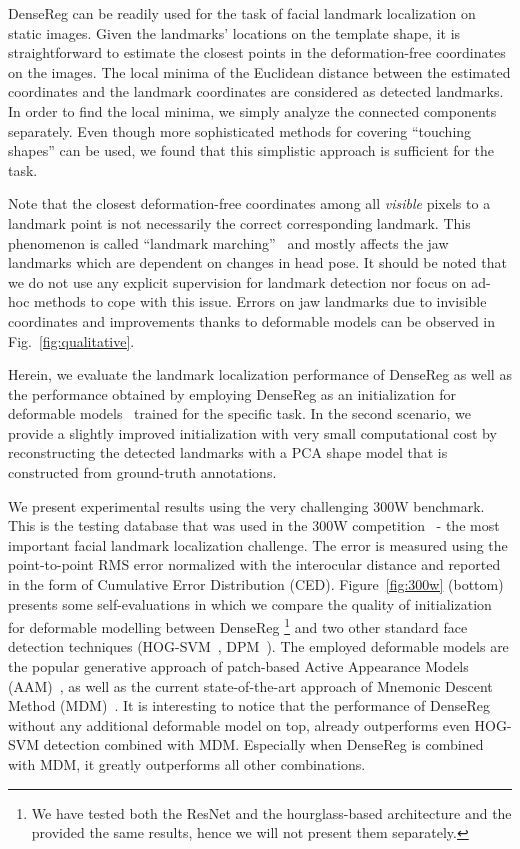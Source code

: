 DenseReg can be readily used for the task of facial landmark localization on static images. Given the landmarks' locations on the template shape, it is straightforward to estimate the closest points in the deformation-free coordinates on the images. The local minima of the Euclidean distance between the estimated coordinates and the landmark coordinates are considered as detected landmarks. In order to find the local minima, we simply analyze the connected components separately. Even though more sophisticated methods for covering ``touching shapes'' can be used, we found that this simplistic approach is sufficient for the task. 

Note that the closest deformation-free coordinates among all \emph{visible} pixels to a landmark point is not necessarily the correct corresponding landmark. This phenomenon is called ``landmark marching''~\cite{zhu2015high} and mostly affects the jaw landmarks which are dependent on changes in head pose. It should be noted that we do not use any explicit supervision for landmark detection nor focus on ad-hoc methods to cope with this issue. Errors on jaw landmarks due to invisible coordinates and improvements thanks to deformable models can be observed in Fig.~\ref{fig:qualitative}.

Herein, we evaluate the landmark localization performance of DenseReg as well as the performance obtained by employing DenseReg as an initialization for deformable models~\cite{papandreou2008adaptive,tzimiropoulos2014gauss,antonakos2015feature,trigeorgis2016mnemonic} trained for the specific task. In the second scenario, we provide a slightly improved initialization with very small computational cost by reconstructing the detected landmarks with a PCA shape model that is constructed from ground-truth annotations. 


We present experimental results using the very challenging 300W benchmark. This is the testing database that was used in the 300W competition~\cite{sagonas_iccv_300w_2013,sagonas2016300} - the most important facial landmark localization challenge. The error is measured using the point-to-point RMS error normalized with the interocular distance and reported in the form of Cumulative Error Distribution (CED). Figure~\ref{fig:300w} (bottom) presents some self-evaluations in which we compare the quality of initialization for deformable modelling between DenseReg \footnote{We have tested both the ResNet and the hourglass-based architecture and the provided the same results, hence we will not present them separately.} and two other standard face detection techniques (HOG-SVM~\cite{king2015max}, DPM~\cite{mathias2014face}). The employed deformable models are the popular generative approach of patch-based Active Appearance Models (AAM)~\cite{papandreou2008adaptive,tzimiropoulos2014gauss,antonakos2015feature}, as well as the current state-of-the-art approach of Mnemonic Descent Method (MDM)~\cite{trigeorgis2016mnemonic}. It is interesting to notice that the performance of DenseReg without any additional deformable model on top, already outperforms even HOG-SVM detection combined with MDM. Especially when DenseReg is combined with MDM, it greatly outperforms all other combinations. 


